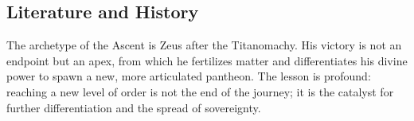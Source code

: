 \subsection{Literature and History}
The archetype of the Ascent is Zeus after the Titanomachy. His victory is not an endpoint but an apex, from which he fertilizes matter and differentiates his divine power to spawn a new, more articulated pantheon. The lesson is profound: reaching a new level of order is not the end of the journey; it is the catalyst for further differentiation and the spread of sovereignty.
